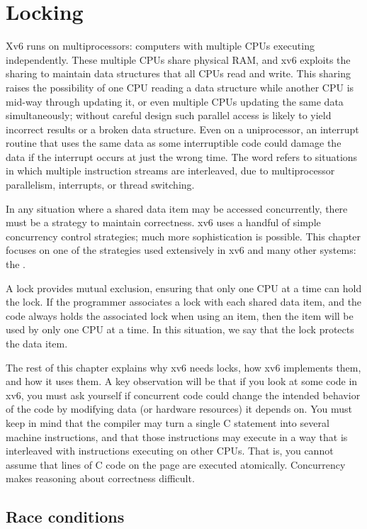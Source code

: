 \chapter{Locking}
\label{CH:LOCK}

Xv6 runs on multiprocessors: computers with
multiple CPUs executing independently.
These multiple CPUs share physical RAM,
and xv6 exploits the sharing to maintain
data structures that all CPUs read and write.
This sharing raises the possibility of
one CPU reading a data structure while another
CPU is mid-way through updating it, or even
multiple CPUs updating the same data simultaneously;
without careful design such parallel access is likely
to yield incorrect results or a broken data structure.
Even on a uniprocessor, an interrupt routine that uses
the same data as some interruptible code could damage
the data if the interrupt occurs at just the wrong time.
The word 
refers to situations in which
multiple instruction streams are interleaved,
due to multiprocessor parallelism, interrupts,
or thread switching.

In any situation where a shared data item may be
accessed concurrently, there must be a
strategy to maintain correctness.
xv6 uses a handful of simple concurrency control
strategies; much more sophistication is possible.
This chapter focuses on one of the strategies used extensively
in xv6 and many other systems: the 
.

A lock provides mutual exclusion, ensuring that only one CPU at a time can hold
the lock. If the programmer associates a lock with each shared data item,
and the code always holds the associated lock when using an item,
then the item will be used by only one CPU at a time.
In this situation, we say that the lock protects the data item.

The rest of this chapter explains why xv6 needs locks, how xv6 implements them, and how
it uses them.  A key observation will be that if you look at some code in
xv6, you must ask yourself if concurrent code could change
the intended behavior of the code by modifying data (or hardware resources)
it depends on.
You must keep in mind that the compiler may turn a
single C statement into several machine instructions,
and that those instructions may execute in a way that is
interleaved with instructions executing on other CPUs.
That is, you cannot assume that lines of C code
on the page are executed atomically.
Concurrency makes reasoning about correctness difficult.
\section{Race conditions}

